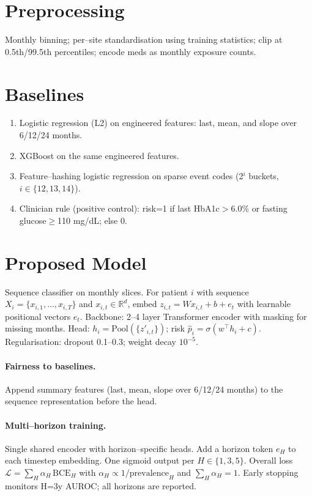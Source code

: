 \documentclass[11pt]{article}
\begin{document}
\section{Preprocessing}
Monthly binning; per--site standardisation using training statistics; clip at 0.5th/99.5th percentiles; encode meds as monthly exposure counts.

\section{Baselines}
\begin{enumerate}[label=\arabic*)]
  \item Logistic regression (L2) on engineered features: last, mean, and slope over 6/12/24 months.
  \item XGBoost \citep{chen2016xgboost} on the same engineered features.
  \item Feature--hashing logistic regression \citep{weinberger2009feature} on sparse event codes (2$^i$ buckets, $i\in\{12,13,14\}$).
  \item Clinician rule (positive control): risk=1 if last HbA1c$>$6.0\% or fasting glucose$\ge$110 mg/dL; else 0.
\end{enumerate}

\section{Proposed Model}
Sequence classifier on monthly slices. For patient $i$ with sequence $X_i=\{x_{i,1},\ldots,x_{i,T}\}$ and $x_{i,t}\in\mathbb{R}^d$, embed $z_{i,t}=Wx_{i,t}+b+e_t$ with learnable positional vectors $e_t$. Backbone: 2--4 layer Transformer encoder \citep{vaswani2017attention} with masking for missing months. Head: $h_i=\mathrm{Pool}(\{z'_{i,t}\})$; risk $\hat p_i=\sigma(w^\top h_i + c)$. Regularisation: dropout 0.1--0.3; weight decay $10^{-5}$.

\paragraph{Fairness to baselines.} Append summary features (last, mean, slope over 6/12/24 months) to the sequence representation before the head.

\paragraph{Multi--horizon training.} Single shared encoder with horizon--specific heads. Add a horizon token $e_H$ to each timestep embedding. One sigmoid output per $H\in\{1,3,5\}$. Overall loss $\mathcal{L}=\sum_H \alpha_H\,\mathrm{BCE}_H$ with $\alpha_H\propto 1/\mathrm{prevalence}_H$ and $\sum_H \alpha_H=1$. Early stopping monitors H=3y AUROC; all horizons are reported.
\end{document}
